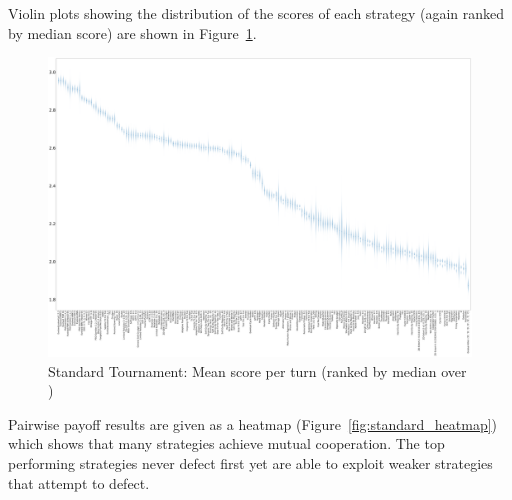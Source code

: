 \documentclass{article}
\begin{document}
Violin plots showing the distribution of the scores of each strategy (again
ranked by median score) are shown in Figure~\ref{fig:standard_boxplot}.

\begin{landscape}
    \begin{figure}[!hbtp]
        \centering
        \includegraphics[width=\paperwidth]{./assets/standard_scores_boxplots.pdf}
        \caption{Standard Tournament: Mean score per turn (ranked by median
        over
        \protecttournaments)}
        \label{fig:standard_boxplot}
    \end{figure}
\end{landscape}

Pairwise payoff results are given as a heatmap (Figure~\ref{fig:standard_heatmap})
which shows that many strategies achieve mutual cooperation. The top performing
strategies never defect first yet are able to exploit weaker strategies that
attempt to defect.
\end{document}
